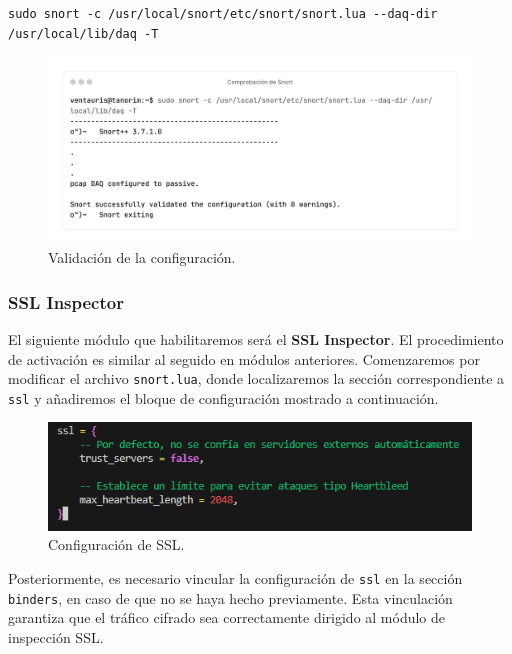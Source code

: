 \documentclass[11pt,a4paper,twoside]{report}
\begin{document}
\begin{lstlisting}[style=commandstyle, caption={Validación avanzada de la configuración de Snort}]
	sudo snort -c /usr/local/snort/etc/snort/snort.lua --daq-dir /usr/local/lib/daq -T
\end{lstlisting}

\begin{figure}[H]
	\centering
	\includegraphics[scale=0.1]{http_inspect/6-6.png}
	\caption{Validación de la configuración.}
\end{figure}


\subsubsection*{SSL Inspector}

El siguiente módulo que habilitaremos será el \textbf{SSL Inspector}. El procedimiento de activación es similar al seguido en módulos anteriores. Comenzaremos por modificar el archivo \texttt{snort.lua}, donde localizaremos la sección correspondiente a \texttt{ssl} y añadiremos el bloque de configuración mostrado a continuación.

\begin{figure}[H]
	\centering
	\includegraphics[scale=0.8]{ssl_inspect/8.png}
	\caption{Configuración de SSL.}
\end{figure}

Posteriormente, es necesario vincular la configuración de \texttt{ssl} en la sección \texttt{binders}, en caso de que no se haya hecho previamente. Esta vinculación garantiza que el tráfico cifrado sea correctamente dirigido al módulo de inspección SSL.
\end{document}
